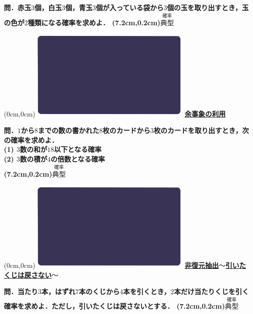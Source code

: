 \documentclass[10pt,
fleqn,
dvipdfmx,
uplatex
]{jsarticle}
\begin{document}
\Large 
\bf\boldmath 問．赤玉$3$個，白玉$3$個，青玉$3$個が入っている袋から$3$個の玉を取り出すとき，玉の色が$2$種類になる確率を求めよ．
\at(7.2cm,0.2cm){\small\color{bradorange}$\overset{\text{確率}}{\text{典型}}$}


\newpage



\at(0cm,0cm){\includegraphics[width=8cm,bb=0 0 1920 1080]{./youtube/thumbnails/templates/smart_background/確率.jpeg}}
{\color{orange}\bf\boldmath\huge\underline{余事象の利用}}\vspace{0.3zw}

\normalsize 
\bf\boldmath 問．$1$から$8$までの数の書かれた$8$枚のカードから$3$枚のカードを取り出すとき，次の確率を求めよ．\\
(1)  $3$数の和が${18}$以下となる確率\\
(2)  $3$数の積が$4$の倍数となる確率\\

\at(7.2cm,0.2cm){\small\color{bradorange}$\overset{\text{確率}}{\text{典型}}$}


\newpage



\at(0cm,0cm){\includegraphics[width=8cm,bb=0 0 1920 1080]{./youtube/thumbnails/templates/smart_background/確率.jpeg}}
{\color{orange}\bf\boldmath\normalsize\underline{非復元抽出$〜$引いたくじは戻さない$〜$}}\vspace{0.3zw}

\Large 
\bf\boldmath 問．当たり$3$本，はずれ$7$本のくじから$4$本を引くとき，$2$本だけ当たりくじを引く確率を求めよ．ただし，引いたくじは戻さないとする．
\at(7.2cm,0.2cm){\small\color{bradorange}$\overset{\text{確率}}{\text{典型}}$}
\end{document}
